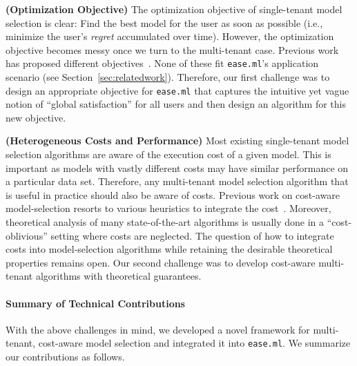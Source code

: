 \documentclass[letterpaper]{vldb}
\newcommand{\eml}{\texttt{ease.ml}\xspace}
\begin{document}
\noindent
{\bf (Optimization Objective)}
The optimization objective of single-tenant model selection is clear: Find the best model for the user as soon as 
possible (i.e., minimize the user's {\em regret} accumulated over time).
However, the optimization objective becomes messy once we turn to the multi-tenant case.
Previous work has proposed different objectives~\cite{Swersky2013}.
None of these fit \eml's application scenario (see Section~\ref{sec:relatedwork}).
Therefore, our first challenge was to design an appropriate objective for \eml that captures the intuitive yet vague notion of ``global satisfaction'' for all users and then design 
an algorithm for this new objective.
 

\noindent
{\bf (Heterogeneous Costs and Performance)} Most
existing single-tenant model selection
 algorithms are aware of the execution cost of
  a given model. This is important as models with
  vastly different costs may have similar performance 
  on a particular data set. Therefore, any multi-tenant
  model selection algorithm that is useful in practice should also
  be aware of costs.
  Previous work on cost-aware model-selection resorts to various heuristics to integrate the cost~\cite{Snoek2012}.
  Moreover, theoretical analysis of many state-of-the-art algorithms is usually done in a ``cost-oblivious'' setting where costs are neglected.
  The question of how to integrate costs into model-selection algorithms while retaining the desirable theoretical properties remains open.
  Our second challenge was to develop cost-aware multi-tenant algorithms with theoretical guarantees.
  
\vspace{-0.5em}
\paragraph*{Summary of Technical Contributions}


With the above challenges in mind, we developed a novel framework for multi-tenant, cost-aware model selection and integrated it into \eml. We summarize our contributions as follows.
\end{document}

